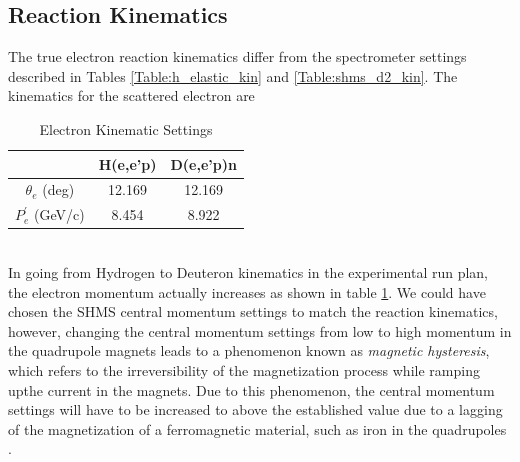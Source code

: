 \documentclass[letterpaper, 12 pt, conference]{ieeeconf}  %
\begin{document}
\subsection{Reaction Kinematics}
\indent The true electron reaction kinematics differ from the spectrometer settings described in Tables
\ref{Table:h_elastic_kin} and \ref{Table:shms_d2_kin}. The kinematics for the scattered electron are
\begin{table}[ht]
\caption{Electron Kinematic Settings}
\centering
{\def\arraystretch{1.6}\tabcolsep=5pt
\begin{tabular}{c c c}
\hline\hline
& \textbf{H(e,e'p)} & \textbf{D(e,e'p)n} \\ [0.5ex] %
\hline
$\theta_{e}$ (deg)    & 12.169 & 12.169 \\           
$P^{'}_{e}$  (GeV/c)   & 8.454 & 8.922 \\
\hline
\end{tabular}
}
\label{Table:elec_kin}
\end{table} \\
In going from Hydrogen to Deuteron kinematics in the experimental run plan, the electron
momentum actually increases as shown in table \ref{Table:elec_kin}. We could have chosen the
SHMS central momentum settings to match the reaction kinematics, however, changing the central
momentum settings from low to high momentum in the quadrupole magnets leads to a phenomenon
known as \textit{magnetic hysteresis}, which refers to the irreversibility of the magnetization process while ramping upthe current in the magnets. Due to this phenomenon, the central momentum
settings will have to be increased to above the established value due to a lagging of the
magnetization of a ferromagnetic material, such as iron in the quadrupoles \cite{hysteresis}. 
\end{document}
